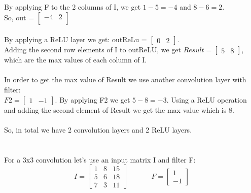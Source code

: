 \documentclass{article}
\begin{document}
\begin{enumerate} [label=\Alph*]
            By applying F to the 2 columns of I, we get $1-5=-4$ and $8-6=2$. \\So, out = 
            $\begin{bmatrix}
              -4 &2 \\
            \end{bmatrix} $
            \\ \\By applying a ReLU layer we get: outReLu = $
            \begin{bmatrix}
              0&2
            \end{bmatrix}$.
            \\ Adding the second row elements of I to outReLU, we get $Result = \begin{bmatrix}
              5 & 8
            \end{bmatrix}$, which are the max values of each column of I. \\ \\
            In order to get the max value of Result we use another convolution layer with filter:\\
            $ F2 = \begin{bmatrix}
              1 & -1
            \end{bmatrix}$. By applying F2 we get $5-8=-3$. Using a ReLU operation and adding the second element of Result we get the max value which is 8.\\\\
            So, in total we have 2 convolution layers and 2 ReLU layers.\\ \\\\For a 3x3 convolution let's use an input matrix I and filter F:
            \[
              I = \begin{bmatrix}
                  1 & 8 & 15\\
                  5 & 6 & 18\\
                  7 & 3 & 11
              \end{bmatrix}
              \quad
              \hspace{1cm}
              F = \begin{bmatrix}
                  1 \\ -1
              \end{bmatrix} 
              \]


\end{enumerate}
\end{document}

